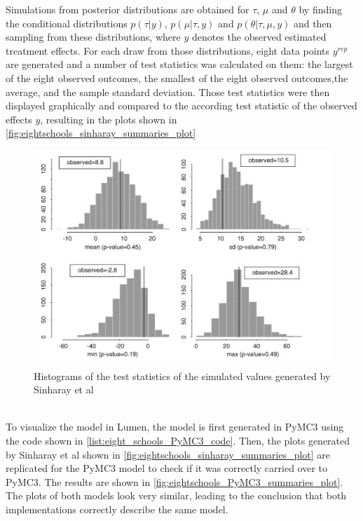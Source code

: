 \documentclass{article}
\begin{document}
Simulations from posterior distributions are obtained for $\tau$, $\mu$ and $\theta$ by finding the conditional distributions $p(\tau|\textit{y})$, $p(\mu|\tau, \textit{y})$ and $p(\theta|\tau, \mu, \textit{y})$ and then sampling from these distributions, where $\textit{y}$ denotes the observed estimated treatment effects. For each draw from those distributions, eight data points $y^{rep}$ are generated and a number of test statistics was calculated on them: the largest of the eight observed outcomes,  the smallest of the eight observed outcomes,the  average, and the sample  standard deviation. Those test statistics were then displayed graphically and compared to the according test statistic of the observed effects $\textit{y}$, resulting in the plots shown in \autoref{fig:eightschools_sinharay_summaries_plot}
\begin{figure}
	\includegraphics[width=\textwidth]{images/eight_schools_sinharay_summaries_plot.png}
	\caption[Histograms of the test statistics of the simulated values generated by Sinharay et al. Source: \cite{sinharay2003posterior}]{Histograms of the test statistics of the simulated values generated by Sinharay et al}
	\label{fig:eightschools_sinharay_summaries_plot}
\end{figure}
\\
To visualize the model in Lumen, the model is first generated in PyMC3 using the code shown in \autoref{list:eight_schools_PyMC3_code}. Then, the plots generated by Sinharay et al shown in \autoref{fig:eightschools_sinharay_summaries_plot} are replicated for the PyMC3 model to check if it was correctly carried over to PyMC3. The results are shown in \autoref{fig:eightschools_PyMC3_summaries_plot}. The plots of both models look very similar, leading to the conclusion that both implementations correctly describe the same model.
\end{document}
